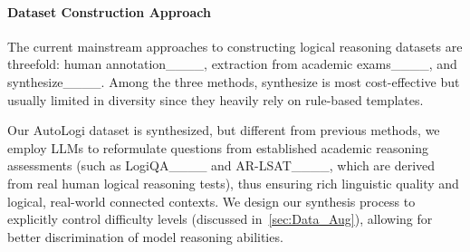 
\paragraph{Dataset Construction Approach}
The current mainstream approaches to constructing logical reasoning datasets are threefold: %
human annotation____, extraction from academic exams____, and synthesize____.
%
Among the three methods, synthesize is most cost-effective but usually limited in diversity since they heavily rely on rule-based templates.




Our AutoLogi dataset is synthesized, but different from previous methods, we employ LLMs to reformulate questions from established academic reasoning assessments (such as LogiQA____ and AR-LSAT____, which are derived from real human logical reasoning tests), thus ensuring rich linguistic quality and logical, real-world connected contexts. We design our synthesis process to explicitly control difficulty levels (discussed in~\ref{sec:Data_Aug}), allowing for better discrimination of model reasoning abilities. %

